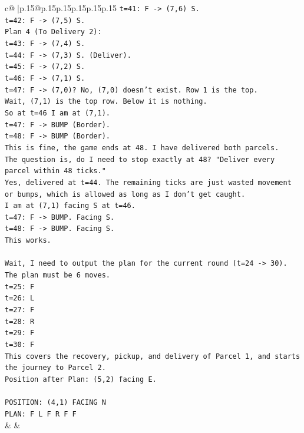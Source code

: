 \documentclass{article}
\begin{document}
{\begin{supertabular}{c@{$\;$}|p{.15\linewidth}@{}p{.15\linewidth}p{.15\linewidth}p{.15\linewidth}p{.15\linewidth}p{.15\linewidth}}
{{{\texttt{t=41: F {-}> (7,6) S.} \\
\texttt{t=42: F {-}> (7,5) S.} \\
\texttt{Plan 4 (To Delivery 2):} \\
\texttt{t=43: F {-}> (7,4) S.} \\
\texttt{t=44: F {-}> (7,3) S. (Deliver).} \\
\texttt{t=45: F {-}> (7,2) S.} \\
\texttt{t=46: F {-}> (7,1) S.} \\
\texttt{t=47: F {-}> (7,0)? No, (7,0) doesn't exist. Row 1 is the top.} \\
\texttt{Wait, (7,1) is the top row. Below it is nothing.} \\
\texttt{So at t=46 I am at (7,1).} \\
\texttt{t=47: F {-}> BUMP (Border).} \\
\texttt{t=48: F {-}> BUMP (Border).} \\
\texttt{This is fine, the game ends at 48. I have delivered both parcels.} \\
\texttt{The question is, do I need to stop exactly at 48? "Deliver every parcel within 48 ticks."} \\
\texttt{Yes, delivered at t=44. The remaining ticks are just wasted movement or bumps, which is allowed as long as I don't get caught.} \\
\texttt{I am at (7,1) facing S at t=46.} \\
\texttt{t=47: F {-}> BUMP. Facing S.} \\
\texttt{t=48: F {-}> BUMP. Facing S.} \\
\texttt{This works.} \\
\\ 
\texttt{Wait, I need to output the plan for the current round (t=24 {-}> 30).} \\
\texttt{The plan must be 6 moves.} \\
\texttt{t=25: F} \\
\texttt{t=26: L} \\
\texttt{t=27: F} \\
\texttt{t=28: R} \\
\texttt{t=29: F} \\
\texttt{t=30: F} \\
\texttt{This covers the recovery, pickup, and delivery of Parcel 1, and starts the journey to Parcel 2.} \\
\texttt{Position after Plan: (5,2) facing E.} \\
\\ 
\texttt{POSITION: (4,1) FACING N} \\
\texttt{PLAN: F L F R F F} \\
            }
        }
    }
    & & \\ \\


\end{supertabular}}
\end{document}
